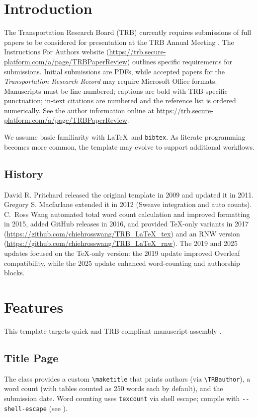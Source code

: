 \documentclass[numbered]{trbunofficial}
\begin{document}
\section{Introduction}\label{sec:intro}
The Transportation Research Board (TRB) currently requires submissions of full papers to be considered for presentation at the TRB Annual Meeting \cite{trbwebsite}.  The Instructions For Authors website (\url{https://trb.secure-platform.com/a/page/TRBPaperReview}) outlines specific requirements for submissions. Initial submissions are PDFs, while accepted papers for the \textit{Transportation Research Record} may require Microsoft Office formats. Manuscripts must be line-numbered; captions are bold with TRB-specific punctuation; in-text citations are numbered and the reference list is ordered numerically. See the author information online at \url{https://trb.secure-platform.com/a/page/TRBPaperReview}.

We assume basic familiarity with \LaTeX\ and \verb|bibtex|. As literate programming becomes more common, the template may evolve to support additional workflows.


\subsection{History}
David R. Pritchard \cite{pritchard} released the original template in 2009 and updated it in 2011. Gregory S. Macfarlane \cite{macfarlane} extended it in 2012 (Sweave integration and auto counts). C.\ Ross Wang \cite{wang} automated total word count calculation and improved formatting in 2015, added GitHub releases in 2016, and provided \TeX-only variants in 2017 (\url{https://github.com/chiehrosswang/TRB_LaTeX_tex}) and an RNW version (\url{https://github.com/chiehrosswang/TRB_LaTeX_rnw}). The 2019 and 2025 updates focused on the \TeX-only version: the 2019 update improved Overleaf compatibility, while the 2025 update enhanced word-counting and authorship blocks.

\section{Features}
This template targets quick and TRB-compliant manuscript assembly \cite{trbwebsite}.

\subsection{Title Page}
The class provides a custom \verb|\maketitle| that prints authors (via \verb|\TRBauthor|), a word count (with tables counted as 250 words each by default), and the submission date. Word counting uses \verb|texcount| via shell escape; compile with \verb|--shell-escape| (see ).
\end{document}
